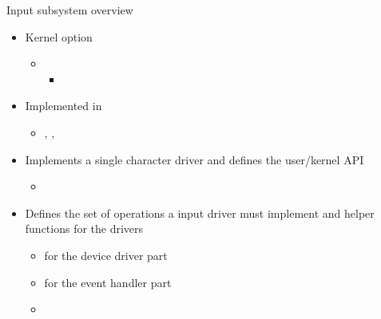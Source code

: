 \begin{frame}{Input subsystem overview}
  \begin{itemize}
  \item Kernel option 
    \begin{itemize}
    \item {}
      \begin{itemize}
      \item {}
      \end{itemize}
    \end{itemize}
  \item Implemented in 
    \begin{itemize}
    \item {}, , 
    \end{itemize}
  \item Implements a single character driver and defines the
    user/kernel API
    \begin{itemize}
    \item {}
    \end{itemize}
  \item Defines the set of operations a input driver must implement
    and helper functions for the drivers
    \begin{itemize}
    \item {} for the device driver part
    \item {} for the event handler part
    \item  {}
    \end{itemize}
  \end{itemize}
\end{frame}

